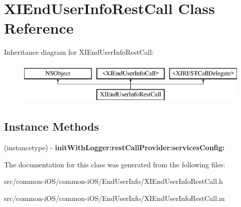 \hypertarget{interface_x_i_end_user_info_rest_call}{}\section{X\+I\+End\+User\+Info\+Rest\+Call Class Reference}
\label{interface_x_i_end_user_info_rest_call}
Inheritance diagram for X\+I\+End\+User\+Info\+Rest\+Call\+:\begin{figure}[H]
\begin{center}
\leavevmode
\includegraphics[height=2.000000cm]{interface_x_i_end_user_info_rest_call}
\end{center}
\end{figure}
\subsection*{Instance Methods}
\begin{DoxyCompactItemize}
\item 
\hypertarget{interface_x_i_end_user_info_rest_call_ae2e4c21f1447b3c64376ea8c7d8f5345}{}\label{interface_x_i_end_user_info_rest_call_ae2e4c21f1447b3c64376ea8c7d8f5345} 
(instancetype) -\/ {\bfseries init\+With\+Logger\+:rest\+Call\+Provider\+:services\+Config\+:}
\end{DoxyCompactItemize}


The documentation for this class was generated from the following files\+:\begin{DoxyCompactItemize}
\item 
src/common-\/i\+O\+S/common-\/i\+O\+S/\+End\+User\+Info/X\+I\+End\+User\+Info\+Rest\+Call.\+h\item 
src/common-\/i\+O\+S/common-\/i\+O\+S/\+End\+User\+Info/X\+I\+End\+User\+Info\+Rest\+Call.\+m\end{DoxyCompactItemize}
